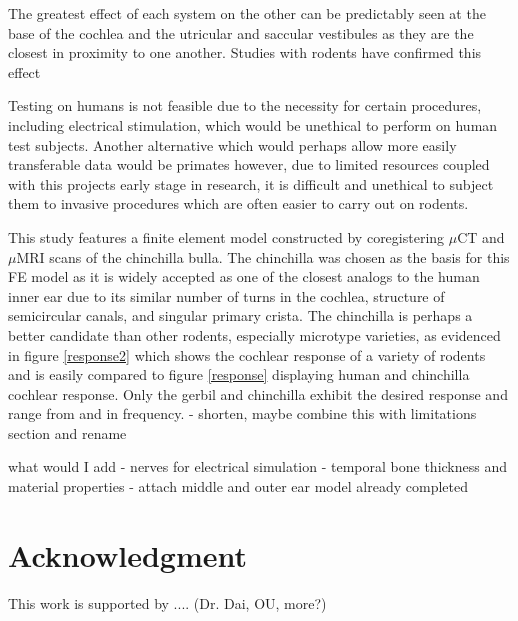 \documentclass[12pt]{article}
\begin{document}
   The greatest effect of each system on the other can be predictably seen at the base of the cochlea and the utricular and saccular vestibules as they are the closest in proximity to one another.  Studies with rodents have confirmed this effect \cite{mizrachi}
   
   Testing on humans is not feasible due to the necessity for certain procedures, including electrical stimulation, which would be unethical to perform on human test subjects. Another alternative which would perhaps allow more easily transferable data would be primates however, due to limited resources coupled with this projects early stage in research, it is difficult and unethical to subject them to invasive procedures which are often easier to carry out on rodents.

This study features a finite element model constructed by coregistering $\mu$CT and $\mu$MRI scans of the chinchilla bulla. The chinchilla was chosen as the basis for this FE model as it is widely accepted as one of the closest analogs to the human inner ear due to its similar number of turns in the cochlea, structure of semicircular canals, and singular primary crista. \cite{trevino:chinchmodel} The chinchilla is perhaps a better candidate than other rodents, especially microtype varieties, as evidenced in figure \ref{response2} which shows the cochlear response of a variety of rodents and is easily compared to figure \ref{response} displaying human and chinchilla cochlear response. Only the gerbil and chinchilla exhibit the desired response and range from and in frequency. \cite{mason}
- shorten, maybe combine this with limitations section and rename

what would I add
- nerves for electrical simulation
- temporal bone thickness and material properties
- attach middle and outer ear model already completed
   
\section{Acknowledgment}
This work is supported by .... (Dr. Dai, OU, more?)



\end{document}
